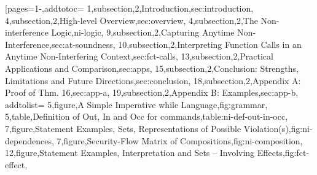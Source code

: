 \pageIconSecurity
{}
[pages={1-},addtotoc={
    1,subsection,2,Introduction,sec:introduction,
    4,subsection,2,High-level Overview,sec:overview,
    4,subsection,2,The Non-interference Logic,ni-logic,
    9,subsection,2,Capturing Anytime Non-Interference,sec:at-soundness,
    10,subsection,2,Interpreting Function Calls in an Anytime Non-Interfering Context,sec:fct-calls,
    13,subsection,2,Practical Applications and Comparison,sec:apps,
    15,subsection,2,{Conclusion: Strengths, Limitations and Future Directions},sec:conclusion,
    18,subsection,2,{Appendix A: Proof of Thm. 16},sec:app-a,
    19,subsection,2,{Appendix B: Examples},sec:app-b},
    addtolist={
        5,figure,{A Simple Imperative while Language},fig:grammar,
        5,table,{Definition of Out, In and Occ for commands},table:ni-def-out-in-occ,
        7,figure,{Statement Examples, Sets, Representations of Possible Violation(s)},fig:ni-dependences,
        7,figure,{Security-Flow Matrix of Compositions},fig:ni-composition,
        12,figure,{Statement Examples, Interpretation and Sets -- Involving Effects},fig:fct-effect},
